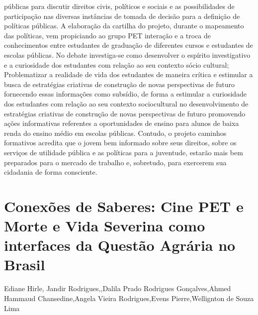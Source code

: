 públicas para discutir direitos civis, políticos e sociais e as possibilidades de participação nas
diversas instâncias de tomada de decisão para a definição de políticas públicas. A elaboração da
cartilha do projeto, durante o mapeamento das políticas, vem propiciando ao grupo PET
interação e a troca de conhecimentos entre estudantes de graduação de diferentes cursos e
estudantes de escolas públicas. No debate investiga-se como desenvolver o espírito investigativo
e a curiosidade dos estudantes com relação ao seu contexto sócio cultural; Problematizar a
realidade de vida dos estudantes de maneira crítica e estimular a busca de estratégias criativas de
construção de novas perspectivas de futuro fornecendo essas informações como subsídio, de
forma a estimular a curiosidade dos estudantes com relação ao seu contexto sociocultural no
desenvolvimento de estratégias criativas de construção de novas perspectivas de futuro
promovendo ações informativas referentes a oportunidades de ensino para alunos de baixa renda
do ensino médio em escolas públicas. Contudo, o projeto caminhos formativos acredita que o
jovem bem informado sobre seus direitos, sobre os serviços de utilidade pública e as políticas
para a juventude, estarão mais bem preparados para o mercado de trabalho e, sobretudo, para
exercerem sua cidadania de forma consciente.



\section{Conexões de Saberes: Cine PET e Morte e Vida Severina como interfaces da Questão  Agrária no Brasil}

Ediane Hirle, Jandir Rodrigues,,Dalila Prado  Rodrigues Gonçalves,Ahmed Hammaud Chansedine,Angela Vieira Rodrigues,Evens Pierre,Wellignton de Souza Lima

